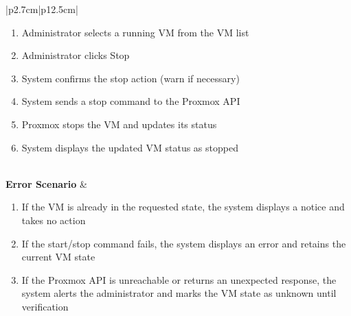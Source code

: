 \begin{table}[H]
\begin{tabular}{|p{2.7cm}|p{12.5cm}|}
\begin{minipage}[t]{\linewidth}
                                      \begin{enumerate}[topsep=0pt,itemsep=1pt,parsep=0pt,partopsep=0pt]
                                          \item Administrator selects a running VM from the VM list
                                          \item Administrator clicks Stop
                                          \item System confirms the stop action (warn if necessary)
                                          \item System sends a stop command to the Proxmox API
                                          \item Proxmox stops the VM and updates its status
                                          \item System displays the updated VM status as stopped
                                      \end{enumerate}
                                  \end{minipage}                        \\
        \hline
        \textbf{Error Scenario} & \begin{minipage}[t]{\linewidth}
                                      \begin{enumerate}[topsep=0pt,itemsep=1pt,parsep=0pt,partopsep=0pt]
                                          \item If the VM is already in the requested state, the system displays a notice and takes no action
                                          \item If the start/stop command fails, the system displays an error and retains the current VM state
                                          \item If the Proxmox API is unreachable or returns an unexpected response, the system alerts the administrator and marks the VM state as unknown until verification
                                      \end{enumerate}
                                  \end{minipage} \\
        \hline
    \end{tabular}
    \label{tab:admin-start-stop-vm}
\end{table}

